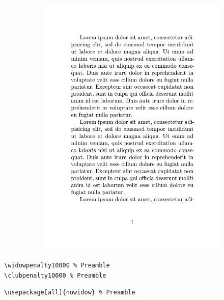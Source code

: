 \documentclass[handout]{beamer}
\begin{document}
\begin{frame}[fragile]
\begin{figure}
\begin{subfigure}{.35\textwidth}
            \includegraphics[page=2,width=\linewidth]{images/hurenkind/hurenkind.pdf}
        \end{subfigure}%
    \end{figure}
    \pause

    \begin{lstlisting}
\widowpenalty10000 % Preamble
\clubpenalty10000 % Preamble
    \end{lstlisting}

    \begin{lstlisting}
\usepackage[all]{nowidow} % Preamble
    \end{lstlisting}
\end{frame}
\end{document}
